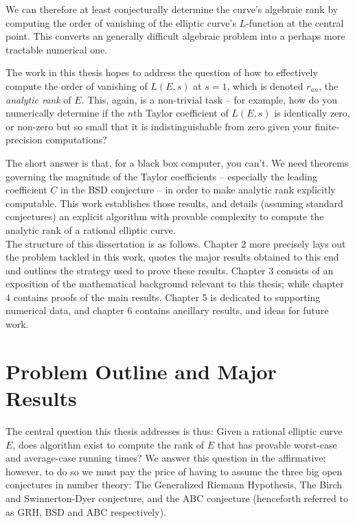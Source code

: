 \documentclass[10pt]{article}
\begin{document}
We can therefore at least conjecturally determine the curve's algebraic rank by computing the order of vanishing of the elliptic curve's $L$-function at the central point. This converts an generally difficult algebraic problem into a perhaps more tractable numerical one.

The work in this thesis hopes to address the question of how to effectively compute the order of vanishing of $L(E,s)$ at $s=1$, which is denoted $r_{an}$, the {\it analytic rank} of $E$. This, again, is a non-trivial task -- for example, how do you numerically determine if the $n$th Taylor coefficient of $L(E,s)$ is identically zero, or non-zero but so small that it is indistinguishable from zero given your finite-precision computations?

The short answer is that, for a black box computer, you can't. We need theorems governing the magnitude of the Taylor coefficients -- especially the leading coefficient $C$ in the BSD conjecture -- in order to make analytic rank explicitly computable. This work establishes those results, and details (assuming standard conjectures) an explicit algorithm with provable complexity to compute the analytic rank of a rational elliptic curve. \\

The structure of this dissertation is as follows. Chapter 2 more precisely lays out the problem tackled in this work, quotes the major results obtained to this end and outlines the strategy used to prove these results. Chapter 3 consists of an exposition of the mathematical background relevant to this thesis; while chapter 4 contains proofs of the main results. Chapter 5 is dedicated to supporting numerical data, and chapter 6 contains ancillary results, and ideas for future work.

\newpage
\section{Problem Outline and Major Results}\label{sec:outline_results}

The central question this thesis addresses is thus: Given a rational elliptic curve $E$, does algorithm exist to compute the rank of $E$ that has provable worst-case and average-case running times? We answer this question in the affirmative; however, to do so we must pay the price of having to assume the three big open conjectures in number theory: The Generalized Riemann Hypothesis, The Birch and Swinnerton-Dyer conjecture, and the ABC conjecture (henceforth referred to as GRH, BSD and ABC respectively).
\end{document}
